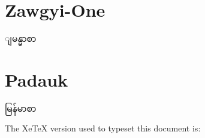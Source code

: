 \documentclass{article}
\begin{document}
\section{Zawgyi-One}
ျမန္မာစာ

\section{Padauk}
မြန်မာစာ

The XeTeX version used to typeset this document is:
 \the\XeTeXversion\XeTeXrevision
\end{document}
